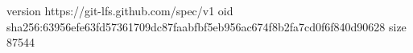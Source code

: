 version https://git-lfs.github.com/spec/v1
oid sha256:63956efe63fd57361709dc87faabfbf5eb956ac674f8b2fa7cd0f6f840d90628
size 87544
